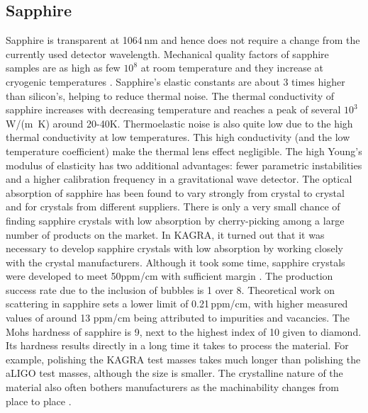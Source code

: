 \subsection{Sapphire}
Sapphire is transparent at 1064\,nm and hence does not require a change from the currently used detector wavelength. Mechanical quality factors of sapphire samples are as high as few $10^8$ at room temperature\cite{Rowan_2000a} and they increase at cryogenic temperatures\cite{uchiyama1999mechanical} . 
Sapphire's elastic constants are about 3 times higher than silicon's, helping to reduce thermal noise. The thermal conductivity of sapphire increases with decreasing temperature and reaches a peak of several $10^3$\,W/(m \,K) around 20-40K.  Thermoelastic noise is also quite low due to the high thermal conductivity at low temperatures.  This high conductivity (and the low temperature coefficient) make the thermal lens effect negligible. The high Young's modulus of elasticity has two additional advantages: fewer parametric instabilities and a higher calibration frequency in a gravitational wave detector.
The optical absorption of sapphire has been found to vary strongly from crystal to crystal and for crystals from different suppliers. There is only a very small chance of finding sapphire crystals with low absorption by cherry-picking among a large number of products on the market. In KAGRA, it turned out that it was necessary to develop sapphire crystals with low absorption by working closely with the crystal manufacturers. Although it took some time, sapphire crystals were developed to meet 50ppm/cm with sufficient margin \cite{Hirose_2014a} . The production success rate due to the inclusion of bubbles is 1 over 8.
Theoretical work on scattering in sapphire sets a lower limit of 0.21\,ppm/cm, with higher measured values of around 13 ppm/cm being attributed to impurities and vacancies.
The Mohs hardness of sapphire is 9, next to the highest index of 10 given to diamond.  Its hardness results directly in a long time it takes to process the material. For example, polishing the KAGRA test masses takes much longer than polishing the aLIGO test masses, although the size is smaller. The crystalline nature of the material also often bothers manufacturers as the machinability changes from place to place .

